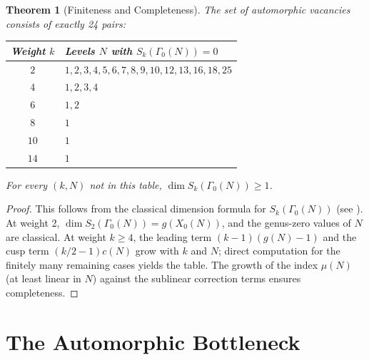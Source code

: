 \documentclass[12pt]{amsart}
\newtheorem{theorem}{Theorem}[section]
\theoremstyle{definition}
\theoremstyle{remark}
\begin{document}
\begin{theorem}[Finiteness and Completeness]\label{thm:finiteness}
The set of automorphic vacancies consists of exactly 24 pairs:

\medskip
\begin{center}
\begin{tabular}{c|l}
Weight $k$ & Levels $N$ with $S_k(\Gamma_0(N)) = 0$ \\ \hline
$2$ & $1, 2, 3, 4, 5, 6, 7, 8, 9, 10, 12, 13, 16, 18, 25$ \\
$4$ & $1, 2, 3, 4$ \\
$6$ & $1, 2$ \\
$8$ & $1$ \\
$10$ & $1$ \\
$14$ & $1$
\end{tabular}
\end{center}
\medskip

\noindent For every $(k, N)$ not in this table, $\dim S_k(\Gamma_0(N)) \geq 1$.
\end{theorem}

\begin{proof}
This follows from the classical dimension formula for $S_k(\Gamma_0(N))$ (see \cite{DS}). At weight 2, $\dim S_2(\Gamma_0(N)) = g(X_0(N))$, and the genus-zero values of $N$ are classical. At weight $k \geq 4$, the leading term $(k-1)(g(N)-1)$ and the cusp term $(k/2 - 1) c(N)$ grow with $k$ and $N$; direct computation for the finitely many remaining cases yields the table. The growth of the index $\mu(N)$ (at least linear in $N$) against the sublinear correction terms ensures completeness.
\end{proof}

\section{The Automorphic Bottleneck}
\label{sec:bottleneck}
\end{document}
